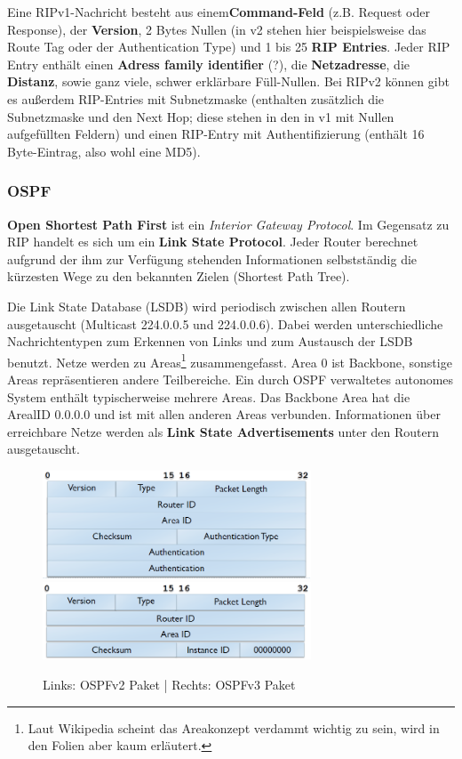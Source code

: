 \documentclass{article} %
\begin{document}
Eine RIPv1-Nachricht besteht aus einem\textbf{Command-Feld} (z.B. Request oder Response), der \textbf{Version}, 2 Bytes Nullen (in v2 stehen hier beispielsweise das Route Tag oder der Authentication Type) und 1 bis 25 \textbf{RIP Entries}.
Jeder RIP Entry enthält einen \textbf{Adress family identifier} (?), die \textbf{Netzadresse}, die \textbf{Distanz}, sowie ganz viele, schwer erklärbare Füll-Nullen.
Bei RIPv2 können gibt es außerdem RIP-Entries mit Subnetzmaske (enthalten zusätzlich die Subnetzmaske und den Next Hop; diese stehen in den in v1 mit Nullen aufgefüllten Feldern) und einen RIP-Entry mit Authentifizierung (enthält 16 Byte-Eintrag, also wohl eine MD5).

\subsubsection{OSPF}
\textbf{Open Shortest Path First} ist ein \emph{Interior Gateway Protocol}.
Im Gegensatz zu RIP handelt es sich um ein \textbf{Link State Protocol}.
Jeder Router berechnet aufgrund der ihm zur Verfügung stehenden Informationen selbstständig die kürzesten Wege zu den bekannten Zielen (Shortest Path Tree).

Die Link State Database (LSDB) wird periodisch zwischen allen Routern ausgetauscht (Multicast 224.0.0.5 und 224.0.0.6).
Dabei werden unterschiedliche Nachrichtentypen zum Erkennen von Links und zum Austausch der LSDB benutzt.
Netze werden zu Areas\footnote{Laut Wikipedia scheint das Areakonzept verdammt wichtig zu sein, wird in den Folien aber kaum erläutert.} zusammengefasst.
Area 0 ist Backbone, sonstige Areas repräsentieren andere Teilbereiche.
Ein durch OSPF verwaltetes autonomes System enthält typischerweise mehrere Areas.
Das Backbone Area hat die ArealID 0.0.0.0 und ist mit allen anderen Areas verbunden.
Informationen über erreichbare Netze werden als \textbf{Link State Advertisements} unter den Routern ausgetauscht.


\begin{figure}[h]
	\begin{center}
		\includegraphics[width=8cm]{img/ospf_packet}
		\includegraphics[width=8cm]{img/ospfv3_packet}
		\caption{Links: OSPFv2 Paket | Rechts: OSPFv3 Paket}
	\end{center}
\end{figure}
\end{document}

